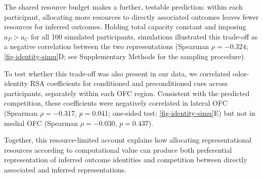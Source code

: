 \documentclass[12pt,letterpaper]{article}
\begin{document}
The shared resource budget makes a further, testable prediction: within each participant, allocating more resources to directly associated outcomes leaves fewer resources for inferred outcomes. Holding total capacity constant and imposing $a_P>a_C$ for all 100 simulated participants, simulations illustrated this trade-off as a negative correlation between the two representations (Spearman $\rho = -0.324$; \autoref{fig-identity-simu}D; see Supplementary Methods for the sampling procedure).

To test whether this trade-off was also present in our data, we correlated odor-identity RSA coefficients for conditioned and preconditioned cues across participants, separately within each OFC region. Consistent with the predicted competition, these coefficients were negatively correlated in lateral OFC (Spearman $\rho = -0.317$, $p = 0.041$; one-sided test; \autoref{fig-identity-simu}E) but not in medial OFC (Spearman $\rho = -0.030$, $p = 0.437$).

Together, this resource-limited account explains how allocating representational resources according to computational value can produce both preferential representation of inferred outcome identities and competition between directly associated and inferred representations.




\par\bigskip\begingroup
{}
\end{document}
